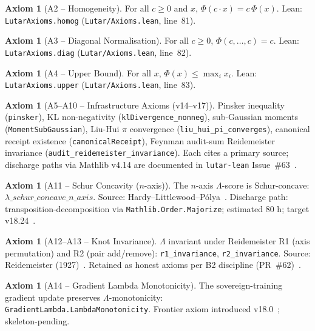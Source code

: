 \documentclass[11pt,letterpaper]{article}
\theoremstyle{definition}
\newtheorem{axiom}[theorem]{Axiom}
\theoremstyle{remark}
\begin{document}
\begin{axiom}[A2 -- Homogeneity]
For all \(c \ge 0\) and \(x\), \(\Phi(c \cdot x) = c\,\Phi(x)\).
\textup{Lean:} \texttt{LutarAxioms.homog}
(\texttt{Lutar/Axioms.lean}, line~81).
\end{axiom}

\begin{axiom}[A3 -- Diagonal Normalisation]
For all \(c \ge 0\), \(\Phi(c,\ldots,c) = c\).
\textup{Lean:} \texttt{LutarAxioms.diag}
(\texttt{Lutar/Axioms.lean}, line~82).
\end{axiom}

\begin{axiom}[A4 -- Upper Bound]
For all \(x\), \(\Phi(x) \le \max_i x_i\).
\textup{Lean:} \texttt{LutarAxioms.upper}
(\texttt{Lutar/Axioms.lean}, line~83).
\end{axiom}

\begin{axiom}[A5--A10 -- Infrastructure Axioms (v14--v17)]
Pinsker inequality (\texttt{pinsker}),
KL non-negativity (\texttt{klDivergence\_nonneg}),
sub-Gaussian moments (\texttt{MomentSubGaussian}),
Liu-Hui \(\pi\) convergence (\texttt{liu\_hui\_pi\_converges}),
canonical receipt existence (\texttt{canonicalReceipt}),
Feynman audit-sum Reidemeister invariance
(\texttt{audit\_reidemeister\_invariance}).
Each cites a primary source; discharge paths via Mathlib v4.14 are
documented in \texttt{lutar-lean} Issue~\#63~\cite{LutarThesisV14}.
\end{axiom}

\begin{axiom}[A11 -- Schur Concavity (\(n\)-axis)]
The \(n\)-axis \(\Lambda\)-score is Schur-concave:
\(\lambda\_schur\_concave\_n\_axis\).
\textup{Source:} Hardy--Littlewood--P{\'o}lya~\cite{HLP1934}.
Discharge path: transposition-decomposition via
\texttt{Mathlib.Order.Majorize};
estimated 80 h; target v18.24~\cite{LutarThesisV16}.
\end{axiom}

\begin{axiom}[A12--A13 -- Knot Invariance]
\(\Lambda\) invariant under Reidemeister R1 (axis permutation) and
R2 (pair add/remove):
\texttt{r1\_invariance}, \texttt{r2\_invariance}.
\textup{Source:} Reidemeister (1927)~\cite{Reidemeister1927}.
Retained as honest axioms per B2 discipline (PR~\#62)~\cite{LutarThesisV15}.
\end{axiom}

\begin{axiom}[A14 -- Gradient Lambda Monotonicity]
The sovereign-training gradient update preserves
\(\Lambda\)-monotonicity:
\texttt{GradientLambda.LambdaMonotonicity}.
Frontier axiom introduced v18.0~\cite{LutarThesisV18}; skeleton-pending.
\end{axiom}
\end{document}
